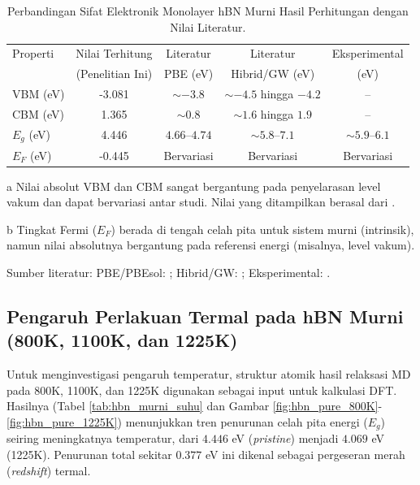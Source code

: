 \begin{table}[h!]
  \centering
  \caption{Perbandingan Sifat Elektronik Monolayer hBN Murni Hasil Perhitungan dengan Nilai Literatur.}
  \label{tab:hbn_murni_literatur_updated}
  \begin{threeparttable}
    \begin{tabular}{lcccc}
      \toprule
      Properti & Nilai Terhitung & Literatur & Literatur & Eksperimental \\
               & (Penelitian Ini) & PBE (eV)   & Hibrid/GW (eV) & (eV)         \\
      \midrule
      VBM (eV)  & -3.081    
      & $\sim -3.8$\tnote{a}      & $\sim -4.5$ hingga $-4.2$ & – \\
      CBM (eV)  & 1.365           & $\sim 0.8$\tnote{a}       & $\sim 1.6$ hingga $1.9$   & – \\
      $E_g$ (eV)& 4.446           & $4.66$–$4.74$             & $\sim 5.8$–$7.1$     
     & $\sim 5.9$–$6.1$ \\
      $E_F$ (eV)& -0.445          & Bervariasi\tnote{b}       & Bervariasi\tnote{b}       & Bervariasi\tnote{b} \\
      \bottomrule
    \end{tabular}
    \begin{tablenotes}[flushleft]
      \footnotesize
      \item[a] Nilai absolut VBM dan CBM sangat bergantung pada penyelarasan level vakum dan dapat bervariasi antar studi. Nilai yang ditampilkan berasal dari \citep{liu2024}.
      \item[b] Tingkat Fermi ($E_F$) berada di tengah celah pita untuk sistem murni (intrinsik), namun nilai absolutnya bergantung pada referensi energi (misalnya, level vakum).
      \item Sumber literatur: PBE/PBEsol: \citep{liu2024,korkmaz2020}; Hibrid/GW: \citep{arnaud2006}; Eksperimental: \citep{Watanabe2004}.
    \end{tablenotes}
  \end{threeparttable}
\end{table}

\subsection{Pengaruh Perlakuan Termal pada hBN Murni (800K, 1100K, dan 1225K)}
\label{subsec:hbn_murni_termal}
Untuk menginvestigasi pengaruh temperatur, struktur atomik hasil relaksasi MD pada 800K, 1100K, dan 1225K digunakan sebagai input untuk kalkulasi DFT. Hasilnya (Tabel \ref{tab:hbn_murni_suhu} dan Gambar \ref{fig:hbn_pure_800K}-\ref{fig:hbn_pure_1225K}) menunjukkan tren penurunan celah pita energi ($E_g$) seiring meningkatnya temperatur, dari $4.446$ eV (\textit{pristine}) menjadi $4.069$ eV (1225K). Penurunan total sekitar $0.377$ eV ini dikenal sebagai pergeseran merah (\textit{redshift}) termal.

